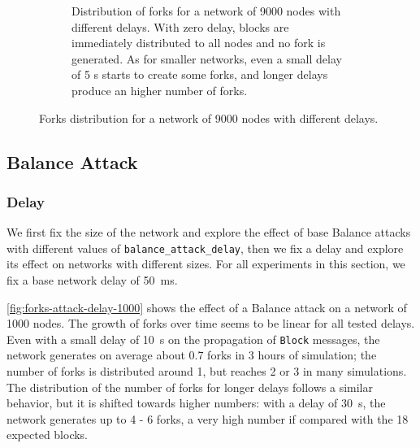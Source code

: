 \begin{figure}[ht]
\begin{subfigure}{\textwidth}
		\vspace*{0.25cm}
		\caption{
			Distribution of forks for a network of \num{9000} nodes with different delays.
			With zero delay, blocks are immediately distributed to all nodes and no fork is generated.
			As for smaller networks, even a small delay of \num{5} s starts to create some forks, and longer delays produce an higher number of forks.
		}
		\vspace*{0.25cm}
	\end{subfigure}
	\caption[Forks distribution for a network of 9000 nodes with different delays]{
		Forks distribution for a network of \num{9000} nodes with different delays.
	}
	\label{fig:forks-delay-9000}
\end{figure}

\subsection{Balance Attack}

\subsubsection{Delay}
We first fix the size of the network and explore the effect of base Balance attacks with different values of \texttt{balance\_attack\_delay}, then we fix a delay and explore its effect on networks with different sizes.
For all experiments in this section, we fix a base network delay of \SI{50}{\milli\second}.

\medskip
\cref{fig:forks-attack-delay-1000} shows the effect of a Balance attack on a network of \num{1000} nodes.
The growth of forks over time seems to be linear for all tested delays.
Even with a small delay of \SI{10}{\second} on the propagation of \texttt{Block} messages, the network generates on average about \num{0.7} forks in \num{3} hours of simulation;
the number of forks is distributed around \num{1}, but reaches \num{2} or \num{3} in many simulations.
The distribution of the number of forks for longer delays follows a similar behavior, but it is shifted towards higher numbers:
with a delay of \SI{30}{\second}, the network generates up to \num{4} - \num{6} forks, a very high number if compared with the \num{18} expected blocks.

